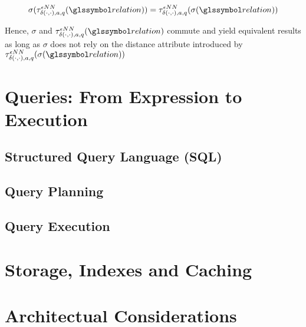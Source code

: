 \begin{equation}
    \sigma(\tau^{\epsilon NN}_{\delta(\cdot,\cdot),a,q}(\relation)) = \tau^{\epsilon NN}_{\delta(\cdot,\cdot),a,q}(\sigma(\relation))
\end{equation}

Hence, $\sigma$ and $\tau^{\epsilon NN}_{\delta(\cdot,\cdot),a,q}(\relation)$ commute and yield equivalent results as long as $\sigma$ does not rely on the distance attribute introduced by $\tau^{\epsilon NN}_{\delta(\cdot,\cdot),a,q}(\sigma(\relation))$

\section{Queries: From Expression to Execution}

\subsection{Structured Query Language (SQL)}

\subsection{Query Planning}

\subsection{Query Execution}

\section{Storage, Indexes and Caching}

\section{Architectual Considerations}
